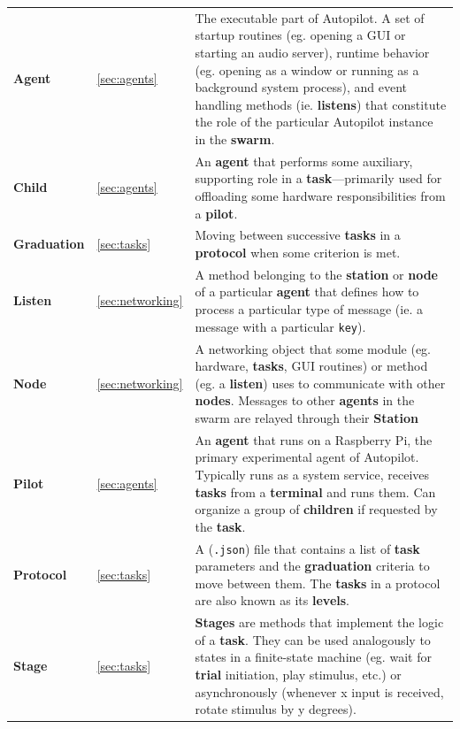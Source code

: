 \begin{fullwidth}
\renewcommand{\arraystretch}{1.25}
\begin{table}[!hb]
\noindent\begin{tabularx}{\linewidth}{llX}

 \textbf{Agent} & \ref{sec:agents} & The executable part of Autopilot. A set of startup routines (eg. opening a GUI or starting an audio server), runtime behavior (eg. opening as a window or running as a background system process), and event handling methods (ie. \textbf{listens}) that constitute the role of the particular Autopilot instance in the \textbf{swarm}. \\
 \textbf{Child} & \ref{sec:agents} & An \textbf{agent} that performs some auxiliary, supporting role in a \textbf{task}---primarily used for offloading some hardware responsibilities from a \textbf{pilot}. \\
 \textbf{Graduation} & \ref{sec:tasks} & Moving between successive \textbf{tasks} in a \textbf{protocol} when some criterion is met.  \\
 \textbf{Listen} & \ref{sec:networking} & A method belonging to the \textbf{station} or \textbf{node} of a particular \textbf{agent} that defines how to process a particular type of message (ie. a message with a particular \texttt{key}). \\
 \textbf{Node} & \ref{sec:networking} & A networking object that some module (eg. hardware, \textbf{tasks}, GUI routines) or method (eg. a \textbf{listen}) uses to communicate with other \textbf{nodes}. Messages to other \textbf{agents} in the swarm are relayed through their \textbf{Station} \\
 \textbf{Pilot} & \ref{sec:agents} & An \textbf{agent} that runs on a Raspberry Pi, the primary experimental agent of Autopilot. Typically runs as a system service, receives \textbf{tasks} from a \textbf{terminal} and runs them. Can organize a group of \textbf{children} if requested by the \textbf{task}. \\
 \textbf{Protocol} & \ref{sec:tasks} & A (\texttt{.json}) file that contains a list of \textbf{task} parameters and the \textbf{graduation} criteria to move between them. The \textbf{tasks} in a protocol are also known as its \textbf{levels}.  \\
 \textbf{Stage} & \ref{sec:tasks} & \textbf{Stages} are methods that implement the logic of a \textbf{task}. They can be used analogously to states in a finite-state machine (eg. wait for \textbf{trial} initiation, play stimulus, etc.) or asynchronously (whenever x input is received, rotate stimulus by y degrees). \\

\end{tabularx}
\end{table}
\end{fullwidth}

